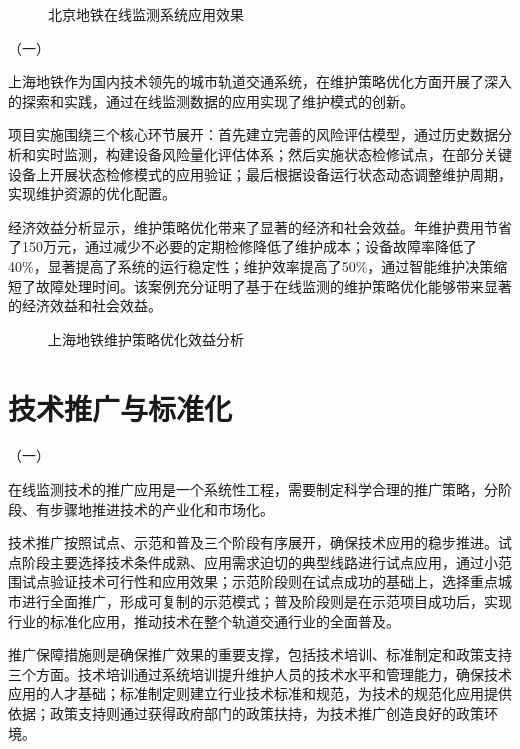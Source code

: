\begin{figure}[h]
\centering
\caption{北京地铁在线监测系统应用效果}
\label{fig:beijing_metro_case}
\end{figure}

（一）

上海地铁作为国内技术领先的城市轨道交通系统，在维护策略优化方面开展了深入的探索和实践，通过在线监测数据的应用实现了维护模式的创新。

项目实施围绕三个核心环节展开：首先建立完善的风险评估模型，通过历史数据分析和实时监测，构建设备风险量化评估体系；然后实施状态检修试点，在部分关键设备上开展状态检修模式的应用验证；最后根据设备运行状态动态调整维护周期，实现维护资源的优化配置。

经济效益分析显示，维护策略优化带来了显著的经济和社会效益。年维护费用节省了150万元，通过减少不必要的定期检修降低了维护成本；设备故障率降低了40\%，显著提高了系统的运行稳定性；维护效率提高了50\%，通过智能维护决策缩短了故障处理时间。该案例充分证明了基于在线监测的维护策略优化能够带来显著的经济效益和社会效益。

\begin{figure}[h]
\centering
\caption{上海地铁维护策略优化效益分析}
\label{fig:shanghai_metro_case}
\end{figure}

\section{技术推广与标准化}

（一）

在线监测技术的推广应用是一个系统性工程，需要制定科学合理的推广策略，分阶段、有步骤地推进技术的产业化和市场化。

技术推广按照试点、示范和普及三个阶段有序展开，确保技术应用的稳步推进。试点阶段主要选择技术条件成熟、应用需求迫切的典型线路进行试点应用，通过小范围试点验证技术可行性和应用效果；示范阶段则在试点成功的基础上，选择重点城市进行全面推广，形成可复制的示范模式；普及阶段则是在示范项目成功后，实现行业的标准化应用，推动技术在整个轨道交通行业的全面普及。

推广保障措施则是确保推广效果的重要支撑，包括技术培训、标准制定和政策支持三个方面。技术培训通过系统培训提升维护人员的技术水平和管理能力，确保技术应用的人才基础；标准制定则建立行业技术标准和规范，为技术的规范化应用提供依据；政策支持则通过获得政府部门的政策扶持，为技术推广创造良好的政策环境。

